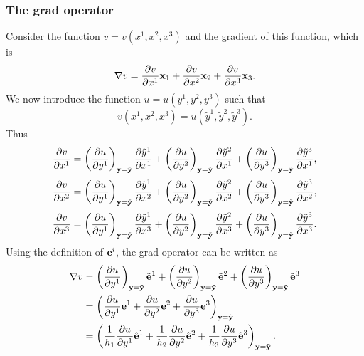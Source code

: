 \documentclass[11pt]{article}
\newcommand{\ytilde}{\tilde{y}}
\begin{document}
\subsubsection{The grad operator}
Consider the function $v = v(x^1, x^2, x^3)$ and the gradient of this function, which is  
\begin{equation}
    \nabla v = \frac{\partial v}{\partial x^1} \mathbf{x}_1 + \frac{\partial v}{\partial x^2} \mathbf{x}_2 + \frac{\partial v}{\partial x^3} \mathbf{x}_3.
\end{equation}
We now introduce the function $u = u(y^1,y^2,y^3)$ such that 
\begin{equation}
    v(x^1, x^2, x^3) = u(\ytilde^1, \ytilde^2, \ytilde^3).
\end{equation}
Thus
\begin{equation}
    \frac{\partial v}{\partial x^1} 
    = \left( \frac{ \partial u}{\partial y^1} \right)_{\yvec = \tilde{\yvec}} \frac{\partial \ytilde^1}{\partial x^1} 
    + \left( \frac{ \partial u}{\partial y^2} \right)_{\yvec = \tilde{\yvec}} \frac{\partial \ytilde^2}{\partial x^1} 
    + \left( \frac{ \partial u}{\partial y^3} \right)_{\yvec = \tilde{\yvec}} \frac{\partial \ytilde^3}{\partial x^1}, 
\end{equation}
\begin{equation}
    \frac{\partial v}{\partial x^2} 
    = \left( \frac{ \partial u}{\partial y^1} \right)_{\yvec = \tilde{\yvec}} \frac{\partial \ytilde^1}{\partial x^2} 
    + \left( \frac{ \partial u}{\partial y^2} \right)_{\yvec = \tilde{\yvec}} \frac{\partial \ytilde^2}{\partial x^2} 
    + \left( \frac{ \partial u}{\partial y^3} \right)_{\yvec = \tilde{\yvec}} \frac{\partial \ytilde^3}{\partial x^2},
\end{equation}
\begin{equation}
    \frac{\partial v}{\partial x^3} 
    = \left( \frac{ \partial u}{\partial y^1} \right)_{\yvec = \tilde{\yvec}} \frac{\partial \ytilde^1}{\partial x^3} 
    + \left( \frac{ \partial u}{\partial y^2} \right)_{\yvec = \tilde{\yvec}} \frac{\partial \ytilde^2}{\partial x^3} 
    + \left( \frac{ \partial u}{\partial y^3} \right)_{\yvec = \tilde{\yvec}} \frac{\partial \ytilde^3}{\partial x^3} .
\end{equation}
Using the definition of $\mathbf{e}^i$, the grad operator can be written as
\begin{align}
    \nabla v &= \left ( \frac{\partial u }{\partial y^1} \right )_{\mathbf{y} = \tilde{\mathbf{y}}} \tilde{\mathbf{e}}^1 + \left ( \frac{\partial u }{\partial y^2} \right )_{\mathbf{y} = \tilde{\mathbf{y}}} \tilde{\mathbf{e}}^2 + \left ( \frac{\partial u }{\partial y^3} \right )_{\mathbf{y} = \tilde{\mathbf{y}}} \tilde{\mathbf{e}}^3 \\
    &= \left( \frac{\partial u }{\partial y^1} \mathbf{e}^1 + \frac{\partial u }{\partial y^2} \mathbf{e}^2 + \frac{\partial u }{\partial y^3} \mathbf{e}^3 \right)_{\mathbf{y} = \tilde{\mathbf{y}}} \\
    &= \left( \frac{1}{h_1} \frac{\partial u }{\partial y^1} \hat{\mathbf{e}}^1 + \frac{1}{h_2} \frac{\partial u }{\partial y^2} \hat{\mathbf{e}}^2 + \frac{1}{h_3} \frac{\partial u }{\partial y^3} \hat{\mathbf{e}}^3 \right)_{\mathbf{y} = \tilde{\mathbf{y}}}.
\end{align}
\end{document}
